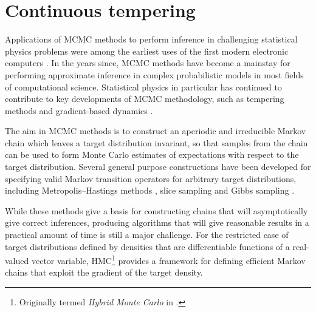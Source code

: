 \chapter{Continuous tempering}\label{ch:continuous-tempering}

Applications of \ac{MCMC} methods to perform inference in challenging statistical physics problems were among the earliest uses of the first modern electronic computers \citep{robert2011short}. In the years since, \ac{MCMC} methods have become a mainstay for performing approximate inference in complex probabilistic models in most fields of computational science. Statistical physics in particular has continued to contribute to key developments of \ac{MCMC} methodology, 
such as tempering methods \citep{swendsen1986replica,geyer1991markov,marinari1992simulated} and gradient-based dynamics \citep{duane1987hybrid}.


The aim in \ac{MCMC} methods is to construct an aperiodic and irreducible Markov chain which leaves a target distribution invariant, so that samples from the chain can be used to form Monte Carlo estimates of expectations with respect to the target distribution. Several general purpose constructions have been developed for specifying valid Markov transition operators for arbitrary target distributions, including Metropolis--Hastings methods \citep{metropolis1953equation,hastings1970monte}, slice sampling \citep{neal2003slice} and Gibbs sampling \citep{geman1984stochastic,gelfand1990sampling}.%

While these methods give a basis for constructing chains that will asymptotically give correct inferences, producing algorithms that will give reasonable results in a practical amount of time is still a major challenge. For the restricted case of target distributions defined by densities that are differentiable functions of a real-valued vector variable, \ac{HMC}\footnote{Originally termed \emph{Hybrid Monte Carlo} in \citep{duane1987hybrid}.} \citep{duane1987hybrid,neal2011mcmc} provides a framework for defining efficient Markov chains that exploit the gradient of the target density.

